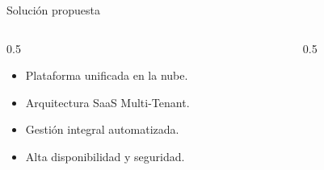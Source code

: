\documentclass[aspectratio=169]{beamer}
\begin{document}
\begin{frame}{Solución propuesta}
    \begin{columns}[T]
        \begin{column}{0.5\textwidth}
            \vspace{1cm}
            \begin{itemize}
                \item Plataforma unificada en la nube.
                \item Arquitectura SaaS Multi-Tenant.
                \item Gestión integral automatizada.
                \item Alta disponibilidad y seguridad.
            \end{itemize}
        \end{column}
        \begin{column}{0.5\textwidth}
            \centering
        \end{column}
    \end{columns}
\end{frame}
\end{document}
